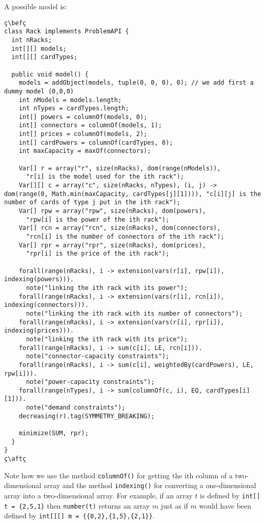 \documentclass[10pt]{article}
\newcommand{\nn}[1]{{\tt #1}} %
\def\bef{\rule{10cm}{0.1mm}} %
\def\aft{\rule{10cm}{0.1mm}\medskip}
\begin{document}
A possible model is:

\begin{lstlisting}
ç\befç
class Rack implements ProblemAPI {
  int nRacks;
  int[][] models; 
  int[][] cardTypes;

  public void model() {
    models = addObject(models, tuple(0, 0, 0), 0); // we add first a dummy model (0,0,0)
    int nModels = models.length;
    int nTypes = cardTypes.length;
    int[] powers = columnOf(models, 0);
    int[] connectors = columnOf(models, 1);
    int[] prices = columnOf(models, 2);
    int[] cardPowers = columnOf(cardTypes, 0);
    int maxCapacity = maxOf(connectors);
    
    Var[] r = array("r", size(nRacks), dom(range(nModels)),
      "r[i] is the model used for the ith rack");
    Var[][] c = array("c", size(nRacks, nTypes), (i, j) -> dom(range(0, Math.min(maxCapacity, cardTypes[j][1]))), "c[i][j] is the number of cards of type j put in the ith rack");
    Var[] rpw = array("rpw", size(nRacks), dom(powers),
      "rpw[i] is the power of the ith rack");
    Var[] rcn = array("rcn", size(nRacks), dom(connectors),
      "rcn[i] is the number of connectors of the ith rack");
    Var[] rpr = array("rpr", size(nRacks), dom(prices),
      "rpr[i] is the price of the ith rack");
    
    forall(range(nRacks), i -> extension(vars(r[i], rpw[i]), indexing(powers))).
      note("linking the ith rack with its power");
    forall(range(nRacks), i -> extension(vars(r[i], rcn[i]), indexing(connectors))).
      note("linking the ith rack with its number of connectors");
    forall(range(nRacks), i -> extension(vars(r[i], rpr[i]), indexing(prices))).
      note("linking the ith rack with its price");
    forall(range(nRacks), i -> sum(c[i], LE, rcn[i])).
      note("connector-capacity constraints");
    forall(range(nRacks), i -> sum(c[i], weightedBy(cardPowers), LE, rpw[i])).
      note("power-capacity constraints");
    forall(range(nTypes), i -> sum(columnOf(c, i), EQ, cardTypes[i][1])).
      note("demand constraints");
    decreasing(r).tag(SYMMETRY_BREAKING);
    
    minimize(SUM, rpr);
  }
}
ç\aftç
\end{lstlisting}

Note how we use the method \nn{columnOf()} for getting the ith column of a two-dimensional array and the method \nn{indexing()} for converting a one-dimensional array into a two-dimensional array.
For example, if an array $t$ is defined by \verb!int[] t = {2,5,1}! then \verb!number(t)! returns an array $m$ just as if $m$ would have been defined by \verb!int[][] m = {{0,2},{1,5},{2,1}}!.
\end{document}

